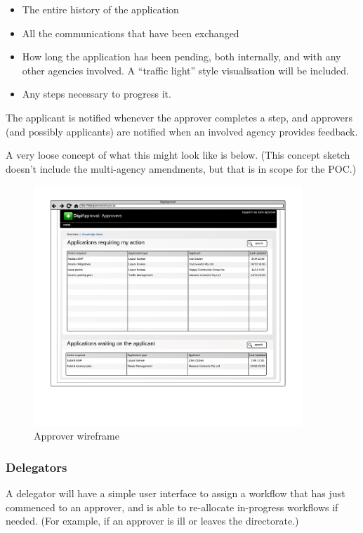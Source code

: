 \documentclass[12pt,a4paper,twosided]{article}
\begin{document}
\begin{itemize}
\itemsep1pt\parskip0pt
\item
  The entire history of the application
\item
  All the communications that have been exchanged
\item
  How long the application has been pending, both internally, and with
  any other agencies involved. A ``traffic light'' style visualisation
  will be included.
\item
  Any steps necessary to progress it.
\end{itemize}

The applicant is notified whenever the approver completes a step, and
approvers (and possibly applicants) are notified when an involved agency
provides feedback.

A very loose concept of what this might look like is below. (This
concept sketch doesn't include the multi-agency amendments, but that is
in scope for the POC.)

\begin{figure}[htbp]
\centering
\includegraphics[width=0.9\textwidth]{./imgs/approver-wireframe.png}
\caption{Approver wireframe}
\end{figure}

\subsubsection{Delegators}\label{delegators}

A delegator will have a simple user interface to assign a workflow that
has just commenced to an approver, and is able to re-allocate
in-progress workflows if needed. (For example, if an approver is ill or
leaves the directorate.)
\end{document}
